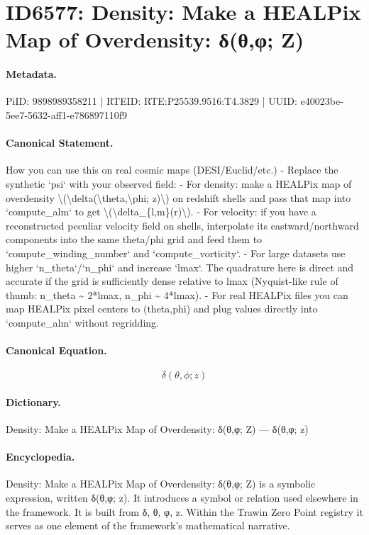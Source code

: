 \section*{ID6577: Density: Make a HEALPix Map of Overdensity: δ(θ,φ; Z)}
\paragraph{Metadata.}
PiID: 9898989358211 | RTEID: RTE:P25539.9516:T4.3829 | UUID: e40023be-5ee7-5632-aff1-e786897110f9

\paragraph{Canonical Statement.}
How you can use this on real cosmic maps (DESI/Euclid/etc.) - Replace the synthetic `psi` with your observed field: - For density: make a HEALPix map of overdensity \textbackslash{}(\textbackslash{}delta(\textbackslash{}theta,\textbackslash{}phi; z)\textbackslash{}) on redshift shells and pass that map into `compute\_alm` to get \textbackslash{}(\textbackslash{}delta\_\{l,m\}(r)\textbackslash{}). - For velocity: if you have a reconstructed peculiar velocity field on shells, interpolate its eastward/northward components into the same theta/phi grid and feed them to `compute\_winding\_number` and `compute\_vorticity`. - For large datasets use higher `n\_theta`/`n\_phi` and increase `lmax`. The quadrature here is direct and accurate if the grid is sufficiently dense relative to lmax (Nyquist-like rule of thumb: n\_theta \textasciitilde{} 2*lmax, n\_phi \textasciitilde{} 4*lmax). - For real HEALPix files you can map HEALPix pixel centers to (theta,phi) and plug values directly into `compute\_alm` without regridding.

\paragraph{Canonical Equation.}
\[
\delta(\theta,\phi; z)
\]

\paragraph{Dictionary.}
Density: Make a HEALPix Map of Overdensity: δ(θ,φ; Z) — δ(θ,φ; z)

\paragraph{Encyclopedia.}
Density: Make a HEALPix Map of Overdensity: δ(θ,φ; Z) is a symbolic expression, written δ(θ,φ; z). It introduces a symbol or relation used elsewhere in the framework. It is built from δ, θ, φ, z. Within the Trawin Zero Point registry it serves as one element of the framework's mathematical narrative.

